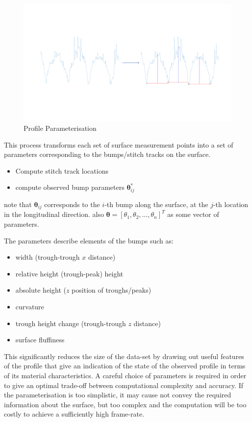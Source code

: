 \documentclass[12pt]{report}
\begin{document}
\begin{figure}
    \centering
    \includegraphics[width=\textwidth,trim={0 5cm 0 5cm},clip]{figures/profile_measure/temp_parameterise.pdf}
    \caption{Profile Parameterisation}
\end{figure}
This process transforms each set of surface measurement points into a set of parameters corresponding to the bumps/stitch tracks on the surface.
        
\begin{itemize}
    \item Compute stitch track locations 
    \item compute observed bump parameters $\pmb{\theta}^*_{ij}$
\end{itemize}
        
note that $\pmb{\theta}_{ij}$ corresponds to the $i$-th bump along the surface, at the $j$-th location in the longitudinal direction. also $\pmb{\theta} = [\theta_1,\theta_2,\ldots ,\theta_n]^T$ as some vector of parameters.
        
        The parameters describe elements of the bumps such as:
        \begin{itemize}
            \item width (trough-trough $x$ distance)
            \item relative height (trough-peak) height
            \item absolute height ($z$ position of troughs/peaks)
            \item curvature
            \item trough height change (trough-trough $z$ distance)
            \item surface fluffiness
        \end{itemize}
         
        This significantly reduces the size of the data-set by drawing out useful features of the profile that give an indication of the state of the observed profile in terms of its material characteristics. A careful choice of parameters is required in order to give an optimal trade-off between computational complexity and accuracy. If the parameterisation is too simplistic, it may cause not convey the required information about the surface, but too complex and the computation will be too costly to achieve a sufficiently high frame-rate.
        
\end{document}
